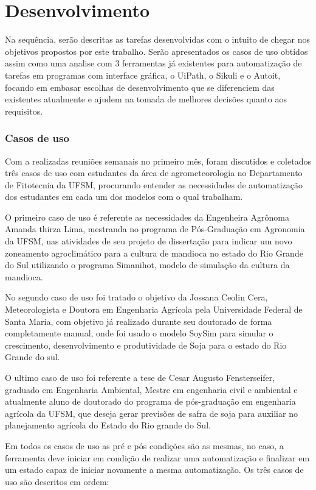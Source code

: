 \documentclass[tg]{mdtufsm}
\begin{document}
	\chapter{Desenvolvimento}

	Na sequência, serão descritas as tarefas desenvolvidas com o intuito de chegar nos objetivos propostos por este trabalho. Serão apresentados os casos de uso obtidos assim como uma analise com 3 ferramentas já existentes para automatização de tarefas em programas com interface gráfica, o UiPath, o Sikuli e o Autoit, focando em embasar escolhas de desenvolvimento que se diferenciem das existentes atualmente e ajudem na tomada de melhores decisões quanto aos requisitos. 
	
	\subsection {Casos de uso}
	
	Com a realizadas reuniões semanais no primeiro mês, foram discutidos e coletados três casos de uso com estudantes da área de agrometeorologia no Departamento de Fitotecnia da UFSM, procurando entender as necessidades de automatização dos estudantes em cada um dos modelos com o qual trabalham. 
	
	O primeiro caso de uso é referente as necessidades da Engenheira Agrônoma Amanda thirza Lima, mestranda no programa de Pós-Graduação em Agronomia da UFSM, nas atividades de seu projeto de dissertação para indicar um novo zoneamento agroclimático para a cultura de mandioca no estado do Rio Grande do Sul utilizando o programa Simanihot, modelo de simulação da cultura da mandioca.
	
	No segundo caso de uso foi tratado o objetivo da Jossana Ceolin Cera, Meteorologista e Doutora em Engenharia Agrícola pela Universidade Federal de Santa Maria, com objetivo já realizado durante seu doutorado de forma completamente manual, onde foi usado o modelo SoySim para simular o crescimento, desenvolvimento e produtividade de Soja para o estado do Rio Grande do sul.

	O ultimo caso de uso foi referente a tese de Cesar Augusto Fensterseifer, graduado em Engenharia Ambiental, Mestre em engenharia civil e ambiental e atualmente aluno de doutorado do programa de pós-graduação em engenharia agrícola da UFSM, que deseja gerar previsões de safra de soja para auxiliar no planejamento agrícola do Estado do Rio grande do Sul. 
	
	Em todos os casos de uso as pré e pós condições são as mesmas, no caso, a ferramenta deve iniciar em condição de realizar uma automatização e finalizar em um estado capaz de iniciar novamente a mesma automatização. Os três casos de uso são descritos em ordem:
	\bigskip \bigskip \bigskip \bigskip
\end{document}
